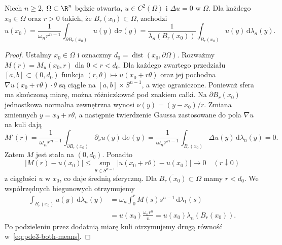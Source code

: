 \begin{twierdzenie}
\label{thm:pde3-mean}
Niech $n\geq2$, $\Omega\subset\R^n$ będzie otwarta,
$u\in C^2(\Omega)$ i $\Delta u=0$ w $\Omega$.
Dla każdego $x_0\in\Omega$ oraz $r>0$ takich, że
$\overline{B_r(x_0)}\subset\Omega$, zachodzi
\begin{equation}\label{eq:pde3-both-means}
 u(x_0)=\frac{1}{\omega_n r^{n-1}}
 \int_{\partial B_r(x_0)}u(y)\,\mathrm d\sigma(y)
 =\frac{1}{\lambda_n(B_r(x_0))}
 \int_{B_r(x_0)}u(y)\,\mathrm d\lambda_n(y).
\end{equation}
\end{twierdzenie}
\begin{proof}
Ustalmy $x_0\in\Omega$ i oznaczmy
$d_0=\operatorname{dist}(x_0,\partial\Omega)$.
Rozważmy $M(r)=M_u(x_0,r)$ dla $0<r<d_0$.
Dla każdego zwartego przedziału $[a,b]\subset(0,d_0)$
funkcja $(r,\theta)\mapsto u(x_0+r\theta)$ oraz jej
pochodna $\nabla u(x_0+r\theta)\cdot\theta$ są ciągłe
na $[a,b]\times S^{n-1}$, a więc ograniczone.
Ponieważ sfera ma skończoną miarę, można różniczkować
pod znakiem całki. Na $\partial B_r(x_0)$ jednostkowa
normalna zewnętrzna wynosi $\nu(y)=(y-x_0)/r$.
Zmiana zmiennych $y=x_0+r\theta$, a następnie
twierdzenie Gaussa zastosowane do pola $\nabla u$
na kuli dają
\[
 M'(r)=\frac{1}{\omega_n r^{n-1}}
 \int_{\partial B_r(x_0)}\partial_\nu u(y)\,
 \mathrm d\sigma(y)
 =\frac{1}{\omega_n r^{n-1}}
 \int_{B_r(x_0)}\Delta u(y)\,\mathrm d\lambda_n(y)=0.
\]
Zatem $M$ jest stała na $(0,d_0)$. Ponadto
\[
 |M(r)-u(x_0)|\leq
 \sup_{\theta\in S^{n-1}}|u(x_0+r\theta)-u(x_0)|
 \longrightarrow0\quad(r\downarrow0)
\]
z ciągłości $u$ w $x_0$, co daje średnią sferyczną.
Dla $\overline{B_r(x_0)}\subset\Omega$ mamy $r<d_0$.
We współrzędnych biegunowych otrzymujemy
\[
 \begin{aligned}
 \int_{B_r(x_0)}u(y)\,\mathrm d\lambda_n(y)
 &=\omega_n\int_0^r M(s)s^{n-1}\,\mathrm d\lambda_1(s)\\
 &=u(x_0)\frac{\omega_n r^n}{n}
 =u(x_0)\lambda_n(B_r(x_0)).
 \end{aligned}
\]
Po podzieleniu przez dodatnią miarę kuli otrzymujemy
drugą równość w~\eqref{eq:pde3-both-means}.
\end{proof}

